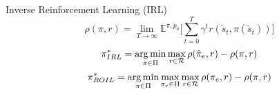 \begin{block}{\normalsize{Inverse Reinforcement Learning (IRL)}}
     \[
       \rho(\pi, r) = \lim_{T \to \infty} \mathbb{E}^{\pi, p_0} \lbrack \sum_{t=0}^{T} \gamma^t r(\tilde{s}_t, \pi(\tilde{s}_t)) \rbrack
     \]
     \[ 
       \pi^*_{IRL} = \operatorname*{arg\,min}_{\pi \in \Pi} \max_{r \in \mathcal{R}} \rho(\hat{\pi}_e, r) - \rho(\pi, r)
     \]
     \[
       \pi^*_{ROIL} = \operatorname*{arg\,min}_{\pi \in \Pi} \max_{\pi_e \in \Pi} \max_{r \in \mathcal{R}} \rho(\pi_e, r) - \rho(\pi, r)
     \]
\end{block}

